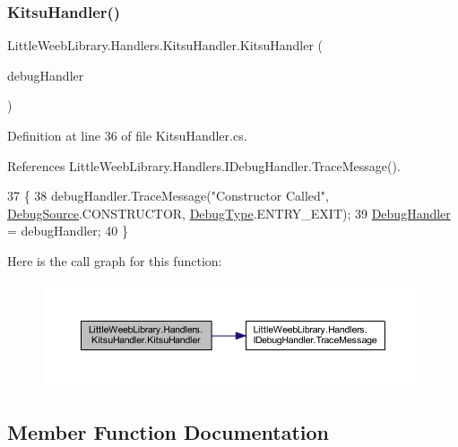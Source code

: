 \subsubsection{\texorpdfstring{Kitsu\+Handler()}{KitsuHandler()}}
{\footnotesize\ttfamily Little\+Weeb\+Library.\+Handlers.\+Kitsu\+Handler.\+Kitsu\+Handler (\begin{DoxyParamCaption}\item[{\mbox{\hyperlink{interface_little_weeb_library_1_1_handlers_1_1_i_debug_handler}{I\+Debug\+Handler}}}]{debug\+Handler }\end{DoxyParamCaption})}



Definition at line 36 of file Kitsu\+Handler.\+cs.



References Little\+Weeb\+Library.\+Handlers.\+I\+Debug\+Handler.\+Trace\+Message().


\begin{DoxyCode}
37         \{
38             debugHandler.TraceMessage(\textcolor{stringliteral}{"Constructor Called"}, \mbox{\hyperlink{namespace_little_weeb_library_1_1_handlers_a2a6ca0775121c9c503d58aa254d292be}{DebugSource}}.CONSTRUCTOR, 
      \mbox{\hyperlink{namespace_little_weeb_library_1_1_handlers_ab66019ed40462876ec4e61bb3ccb0a62}{DebugType}}.ENTRY\_EXIT);
39             \mbox{\hyperlink{class_little_weeb_library_1_1_handlers_1_1_kitsu_handler_a6d3c55fa5eee15320845c2d902c96882}{DebugHandler}} = debugHandler;
40         \}
\end{DoxyCode}
Here is the call graph for this function\+:\nopagebreak
\begin{figure}[H]
\begin{center}
\leavevmode
\includegraphics[width=350pt]{class_little_weeb_library_1_1_handlers_1_1_kitsu_handler_a92f980060f9277a512dfda67768a7428_cgraph}
\end{center}
\end{figure}


\subsection{Member Function Documentation}
\mbox{\label{class_little_weeb_library_1_1_handlers_1_1_kitsu_handler_a92f121e8fec8cce5ffe0454d3a17c156}} 
